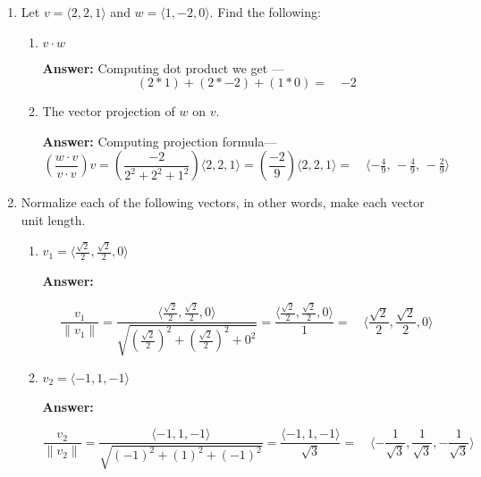 \documentclass{article}
\newcommand{\vect}[1]{\langle #1 \rangle}
\begin{document}
\begin{enumerate}
\item Let $v=\vect{2,2,1}$ and $w=\vect{1,-2,0}$.  Find the following:
  \begin{enumerate}
  \item $v\cdot w$
  
\textbf{Answer:} Computing dot product we get — 
\begin {equation}
(2*1) + (2*-2) + (1*0) 
= \quad \boxed{-2} 
\end {equation}

  \item The vector projection of $w$ on $v$.

\vspace{1em}
\textbf{Answer:} Computing projection formula—
\begin {equation}
    \left(\frac{w \cdot v}{v \cdot v}\right) v
    = \left(\frac{-2}{2^2 + 2^2 + 1^2}\right) \vect{2,2,1}
    = \left(\frac{-2}{9}\right)\vect{2,2,1}
    = \quad \boxed{\vect{-\tfrac{4}{9},\, -\tfrac{4}{9},\, -\tfrac{2}{9}}}
\end {equation}

 \end{enumerate}

\item Normalize each of the following vectors, in other words, make
  each vector unit length.
  
  \begin{enumerate}
  \item $v_1 = \vect{\frac{\sqrt{2}}{2}, \frac{\sqrt{2}}{2}, 0}$ 
  
\vspace{1em}
\textbf{Answer: }

\begin {equation}
    \frac{v_1}{\|v_1\|}
    = \frac{\vect{\frac{\sqrt{2}}{2}, \frac{\sqrt{2}}{2}, 0}}{\sqrt{\left(\frac{\sqrt2}{2}\right)^2 + \left(\frac{\sqrt2}{2}\right)^2 + 0^2}}
  = \frac{\vect{\frac{\sqrt{2}}{2}, \frac{\sqrt{2}}{2}, 0}}{1}
  =\quad \boxed{{\vect{\frac{\sqrt{2}}{2}, \frac{\sqrt{2}}{2}, 0}}}
\end {equation}

\vspace{1em}

  \item $v_2 = \vect{-1,1,-1}$

\vspace{1em}
  \textbf{Answer: }
  
\begin {equation}
    \frac{v_2}{\|v_2\|}
    = \frac{\vect{-1,1,-1}}{\sqrt{(-1)^2 + (1)^2 +(-1)^2 }}
  = \frac{\vect{-1,1,-1}}{\sqrt{3}}
  =\quad \boxed{\vect{-\frac{1}{\sqrt{3}}, \frac{1}{\sqrt{3}}, -\frac{1}{\sqrt{3}}}}
\end {equation}


\end{enumerate}
\end{enumerate}
\end{document}
